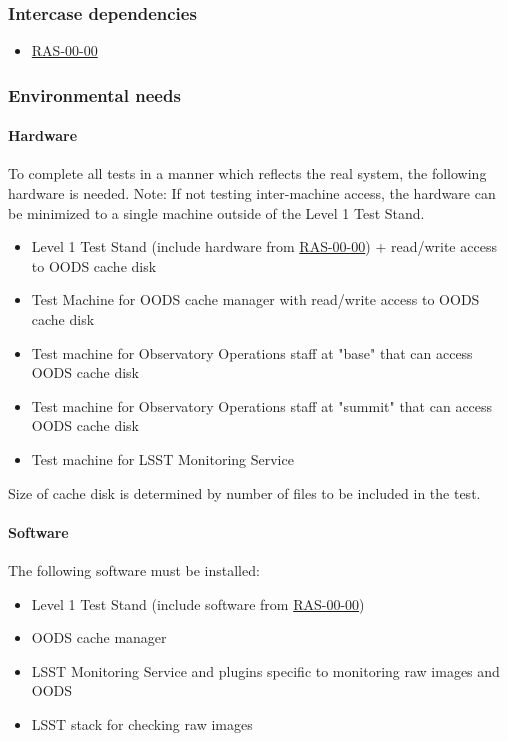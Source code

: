 \documentclass[DM,lsstdraft,STS,toc]{lsstdoc}
\begin{document}
\subsubsection{Intercase dependencies}
\begin{itemize}
\item{\hyperref[ras-00-00]{RAS-00-00}}
\end{itemize}


\subsubsection{Environmental needs}
\paragraph{Hardware}


To complete all tests in a manner which reflects the real system,
the following hardware is needed.  Note: If not testing inter-machine access, the hardware can be minimized to a single machine outside of the Level 1 Test Stand.


\begin{itemize}
\item{Level 1 Test Stand (include hardware from \hyperref[ras-00-00]{RAS-00-00}) + read/write access to OODS cache disk}
\item{Test Machine for OODS cache manager with read/write access to OODS cache disk}
\item{Test machine for Observatory Operations staff at "base" that can access OODS cache disk}
\item{Test machine for Observatory Operations staff at "summit" that can access OODS cache disk}
\item{Test machine for LSST Monitoring Service}
\end{itemize}


Size of cache disk is determined by number of files to be included in the test.






\paragraph{Software}


The following software must be installed:
\begin{itemize}
\item{Level 1 Test Stand (include software from \hyperref[ras-00-00]{RAS-00-00})}
\item{OODS cache manager}
\item{LSST Monitoring Service and plugins specific to monitoring raw images and OODS}
\item{LSST stack for checking raw images}
\end{itemize}
\end{document}
